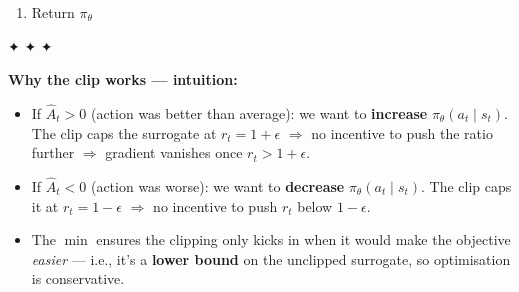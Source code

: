 \documentclass[11pt]{article}
\providecommand{\tightlist}{%
      \setlength{\itemsep}{0pt}\setlength{\parskip}{0pt}}
\begin{document}
\begin{enumerate}
\begin{itemize}
\begin{itemize}
      \begin{itemize}
      \tightlist
      \item
        Compute ratio:
        \(\;r_t(\theta) = \exp\!\bigl(\log\pi_\theta(a_t \mid s_t) - \log\pi_{\theta_\text{old}}(a_t \mid s_t)\bigr)\)
      \item
        \textbf{Clipped policy loss:}
        \[\mathcal{L}^{\text{CLIP}}(\theta) = -\frac{1}{B}\sum_t \min\!\Bigl(r_t(\theta)\,\hat{A}_t,\;\; \mathrm{clip}(r_t(\theta), 1-\epsilon, 1+\epsilon)\,\hat{A}_t\Bigr)\]
      \item
        \textbf{Value loss:}
        \[\mathcal{L}^{\text{V}}(w) = \frac{1}{B}\sum_t \bigl(V_w(s_t) - \hat{R}_t\bigr)^2\]
      \item
        \textbf{Entropy bonus:}
        \(\;\mathcal{L}^{\text{H}}(\theta) = -\dfrac{1}{B}\sum_t H\!\bigl(\pi_\theta(\cdot \mid s_t)\bigr)\)
      \item
        \textbf{Total loss:}
        \(\;\mathcal{L}(\theta, w) = \mathcal{L}^{\text{CLIP}}(\theta) + c_v\,\mathcal{L}^{\text{V}}(w) + \beta\,\mathcal{L}^{\text{H}}(\theta)\)
      \item
        Gradient step:
        \(\;\theta \leftarrow \theta - \alpha_\theta\,\nabla_\theta\,\mathcal{L},\;\; w \leftarrow w - \alpha_w\,\nabla_w\,\mathcal{L}\)
      \end{itemize}
    \end{itemize}
  \end{itemize}
\item
  Return \(\pi_\theta\)
\end{enumerate}

✦ ✦ ✦

\textbf{Why the clip works --- intuition:}

\begin{itemize}
\tightlist
\item
  If \(\hat{A}_t > 0\) (action was better than average): we want to
  \textbf{increase} \(\pi_\theta(a_t \mid s_t)\). The clip caps the
  surrogate at \(r_t = 1+\epsilon\) \(\Rightarrow\) no incentive to push
  the ratio further \(\Rightarrow\) gradient vanishes once
  \(r_t > 1+\epsilon\).
\item
  If \(\hat{A}_t < 0\) (action was worse): we want to \textbf{decrease}
  \(\pi_\theta(a_t \mid s_t)\). The clip caps it at \(r_t = 1-\epsilon\)
  \(\Rightarrow\) no incentive to push \(r_t\) below \(1-\epsilon\).
\item
  The \(\min\) ensures the clipping only kicks in when it would make the
  objective \emph{easier} --- i.e., it's a \textbf{lower bound} on the
  unclipped surrogate, so optimisation is conservative.
\end{itemize}
\end{document}
